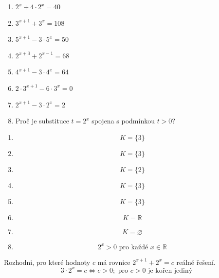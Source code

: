\documentclass[11pt,a4paper]{article}
\begin{document}
\begin{zadaniReseniBox}[title={Samostatná práce 1}]
\begin{enumerate}[label=\alph*)]
\item $2^x+4\cdot2^x=40$
\item $3^{x+1}+3^x=108$
\item $5^{x+1}-3\cdot5^x=50$
\item $2^{x+3}+2^{x-1}=68$
\item $4^{x+1}-3\cdot4^x=64$
\item $2\cdot3^{x+1}-6\cdot3^x=0$
\item $2^{x+1}-3\cdot2^x=2$
\item Proč je substituce $t=2^x$ spojena s podmínkou $t>0$?
\end{enumerate}
\tcblower
\begin{enumerate}[label=\alph*)]
\item \[
K=\{3\}
\]
\item \[
K=\{3\}
\]
\item \[
K=\{2\}
\]
\item \[
K=\{3\}
\]
\item \[
K=\{3\}
\]
\item \[
K=\mathbb R
\]
\item \[
K=\varnothing
\]
\item \[
2^x>0\text{ pro každé }x\in\mathbb R
\]
\end{enumerate}
\end{zadaniReseniBox}
\begin{zadaniReseniBox}[title={Rozšíření 1}]
Rozhodni, pro které hodnoty $c$ má rovnice $2^{x+1}+2^x=c$ reálné řešení.
\tcblower
\[
3\cdot2^x=c\iff c>0;\text{ pro }c>0\text{ je kořen jediný}
\]
\end{zadaniReseniBox}
\end{document}
